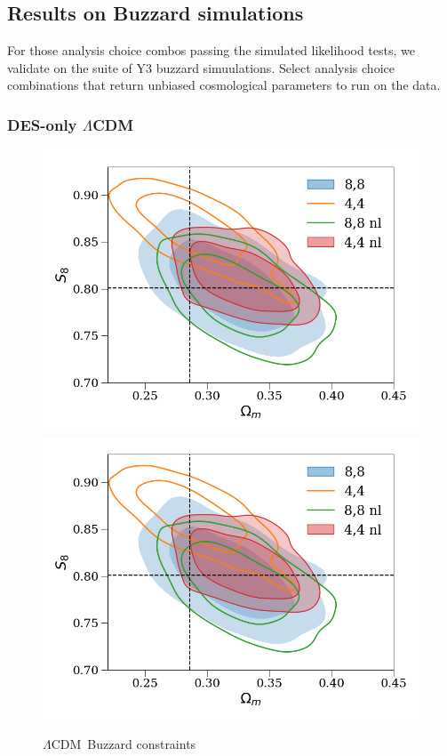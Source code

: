 \documentclass[fleqn,usenatbib]{mnras}
\newcommand{\lcdm}{$\Lambda$CDM}
\begin{document}
\subsection{Results on Buzzard simulations}

For those analysis choice combos passing the simulated likelihood tests, we validate on the suite of Y3 buzzard simuulations. Select analysis choice combinations that return unbiased cosmological parameters to run on the data. 

\subsubsection{DES-only \lcdm}

\begin{figure}
\includegraphics[width=\columnwidth]{figs/buzzard_lcdm_om-s8.png}
\includegraphics[width=\columnwidth]{figs/buzzard_lcdm_om-s8.png}
\caption[]{\lcdm\ Buzzard constraints }
\label{fig:color_ims}
\end{figure}
\end{document}
